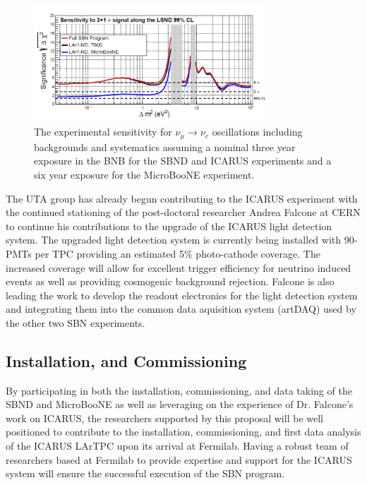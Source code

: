 \begin{figure}[htb]
\centering
\includegraphics[width=0.78\textwidth]{images/Sensitivity.png}
\caption[]{The experimental sensitivity for $\nu_{\mu} \rightarrow \nu_{e}$ oscillations including backgrounds and systematics assuming a nominal three year exposure in the BNB for the SBND and ICARUS experiments and a six year exposure for the MicroBooNE experiment.}
\label{fig:sense}
\end{figure}


The UTA group has already begun contributing to the ICARUS experiment with the continued stationing of the post-doctoral researcher Andrea Falcone at CERN to continue his contributions to the upgrade of the ICARUS light detection system. The upgraded light detection system is currently being installed with 90-PMTs per TPC providing an estimated 5$\%$ photo-cathode coverage. The increased coverage will allow for excellent trigger efficiency for neutrino induced events as well as providing cosmogenic background rejection. Falcone is also leading the work to develop the readout electronics for the light detection system and integrating them into the common data aquisition system (artDAQ) used by the other two SBN experiments.


\subsection{Installation, and Commissioning}\label{sec:ICARUSBulid}
By participating in both the installation, commissioning, and data taking of the SBND and MicroBooNE as well as leveraging on the experience of Dr. Falcone's work on ICARUS, the researchers supported by this proposal will be well positioned to contribute to the installation, commissioning, and first data analysis of the ICARUS LArTPC upon its arrival at Fermilab. Having a robust team of researchers based at Fermilab to provide expertise and support for the ICARUS system will ensure the successful execution of the SBN program.

